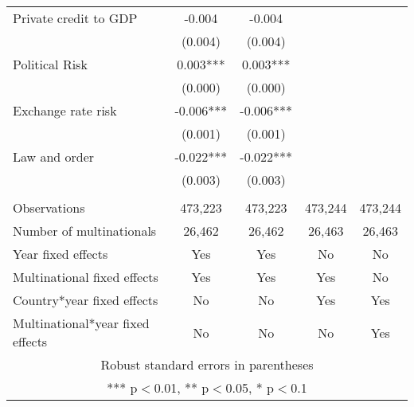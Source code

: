 \begin{tabular}{lcccc}
Private credit to GDP & -0.004 & -0.004 &  &  \\
 & (0.004) & (0.004) &  &  \\
Political Risk & 0.003*** & 0.003*** &  &  \\
 & (0.000) & (0.000) &  &  \\
Exchange rate risk & -0.006*** & -0.006*** &  &  \\
 & (0.001) & (0.001) &  &  \\
Law and order & -0.022*** & -0.022*** &  &  \\
 & (0.003) & (0.003) &  &  \\
 &  &  &  &  \\
Observations & 473,223 & 473,223 & 473,244 & 473,244 \\
Number of multinationals & 26,462 & 26,462 & 26,463 & 26,463 \\
Year fixed effects & Yes & Yes & No & No \\
Multinational fixed effects & Yes & Yes & Yes & No \\
Country*year fixed effects & No & No & Yes & Yes \\
 Multinational*year fixed effects & No & No & No & Yes \\ \hline
\multicolumn{5}{c}{ Robust standard errors in parentheses} \\
\multicolumn{5}{c}{ *** p$<$0.01, ** p$<$0.05, * p$<$0.1} \\
\end{tabular}
